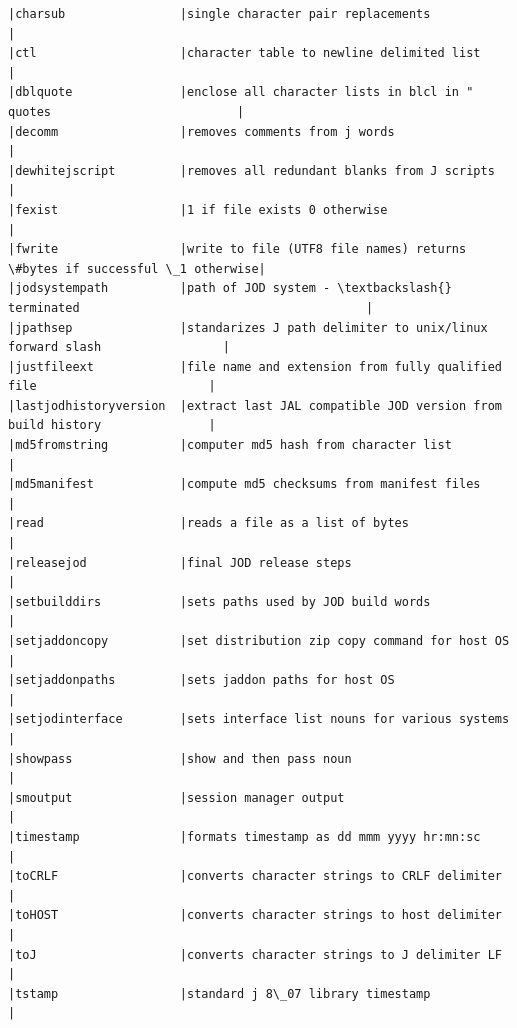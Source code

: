 \documentclass[11pt,letter,landscape]{article}
\begin{document}
\begin{Verbatim}[commandchars=\\\{\}]
|charsub                |single character pair replacements                                       |
|ctl                    |character table to newline delimited list                                |
|dblquote               |enclose all character lists in blcl in " quotes                          |
|decomm                 |removes comments from j words                                            |
|dewhitejscript         |removes all redundant blanks from J scripts                              |
|fexist                 |1 if file exists 0 otherwise                                             |
|fwrite                 |write to file (UTF8 file names) returns \#bytes if successful \_1 otherwise|
|jodsystempath          |path of JOD system - \textbackslash{} terminated                                        |
|jpathsep               |standarizes J path delimiter to unix/linux forward slash                 |
|justfileext            |file name and extension from fully qualified file                        |
|lastjodhistoryversion  |extract last JAL compatible JOD version from build history               |
|md5fromstring          |computer md5 hash from character list                                    |
|md5manifest            |compute md5 checksums from manifest files                                |
|read                   |reads a file as a list of bytes                                          |
|releasejod             |final JOD release steps                                                  |
|setbuilddirs           |sets paths used by JOD build words                                       |
|setjaddoncopy          |set distribution zip copy command for host OS                            |
|setjaddonpaths         |sets jaddon paths for host OS                                            |
|setjodinterface        |sets interface list nouns for various systems                            |
|showpass               |show and then pass noun                                                  |
|smoutput               |session manager output                                                   |
|timestamp              |formats timestamp as dd mmm yyyy hr:mn:sc                                |
|toCRLF                 |converts character strings to CRLF delimiter                             |
|toHOST                 |converts character strings to host delimiter                             |
|toJ                    |converts character strings to J delimiter LF                             |
|tstamp                 |standard j 8\_07 library timestamp                                        |

\end{Verbatim}
\end{document}

